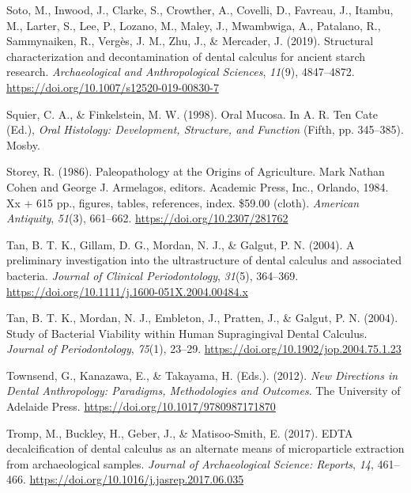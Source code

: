 \documentclass[
  b5paper,
]{book}
\newlength{\cslhangindent}
\newenvironment{CSLReferences}[2] %
 {\begin{list}{}{%
  \setlength{\itemindent}{0pt}
  \setlength{\leftmargin}{0pt}
  \setlength{\parsep}{0pt}
  \ifodd #1
   \setlength{\leftmargin}{\cslhangindent}
   \setlength{\itemindent}{-1\cslhangindent}
  \fi
  \setlength{\itemsep}{#2\baselineskip}}}
 {\end{list}}
\begin{document}
\begin{CSLReferences}{1}{0}
Soto, M., Inwood, J., Clarke, S., Crowther, A., Covelli, D., Favreau,
J., Itambu, M., Larter, S., Lee, P., Lozano, M., Maley, J., Mwambwiga,
A., Patalano, R., Sammynaiken, R., Vergès, J. M., Zhu, J., \& Mercader,
J. (2019). Structural characterization and decontamination of dental
calculus for ancient starch research. \emph{Archaeological and
Anthropological Sciences}, \emph{11}(9), 4847--4872.
\url{https://doi.org/10.1007/s12520-019-00830-7}

Squier, C. A., \& Finkelstein, M. W. (1998). Oral {Mucosa}. In A. R. Ten
Cate (Ed.), \emph{Oral {Histology}: {Development}, {Structure}, and
{Function}} (Fifth, pp. 345--385). {Mosby}.

Storey, R. (1986). Paleopathology at the {Origins} of {Agriculture}.
{Mark Nathan Cohen} and {George J}. {Armelagos}, editors. {Academic
Press}, {Inc}., {Orlando}, 1984. Xx + 615 pp., figures, tables,
references, index. \$59.00 (cloth). \emph{American Antiquity},
\emph{51}(3), 661--662. \url{https://doi.org/10.2307/281762}

Tan, B. T. K., Gillam, D. G., Mordan, N. J., \& Galgut, P. N. (2004). A
preliminary investigation into the ultrastructure of dental calculus and
associated bacteria. \emph{Journal of Clinical Periodontology},
\emph{31}(5), 364--369.
\url{https://doi.org/10.1111/j.1600-051X.2004.00484.x}

Tan, B. T. K., Mordan, N. J., Embleton, J., Pratten, J., \& Galgut, P.
N. (2004). Study of {Bacterial Viability} within {Human Supragingival
Dental Calculus}. \emph{Journal of Periodontology}, \emph{75}(1),
23--29. \url{https://doi.org/10.1902/jop.2004.75.1.23}

Townsend, G., Kanazawa, E., \& Takayama, H. (Eds.). (2012). \emph{New
{Directions} in {Dental Anthropology}: {Paradigms}, {Methodologies} and
{Outcomes}}. {The University of Adelaide Press}.
\url{https://doi.org/10.1017/9780987171870}

Tromp, M., Buckley, H., Geber, J., \& Matisoo-Smith, E. (2017). {EDTA}
decalcification of dental calculus as an alternate means of
microparticle extraction from archaeological samples. \emph{Journal of
Archaeological Science: Reports}, \emph{14}, 461--466.
\url{https://doi.org/10.1016/j.jasrep.2017.06.035}


\end{CSLReferences}
\end{document}

